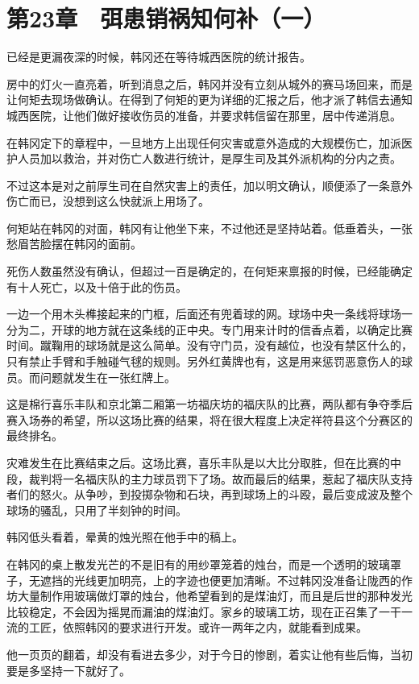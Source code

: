 \section{第23章　弭患销祸知何补（一）}

已经是更漏夜深的时候，韩冈还在等待城西医院的统计报告。

房中的灯火一直亮着，听到消息之后，韩冈并没有立刻从城外的赛马场回来，而是让何矩去现场做确认。在得到了何矩的更为详细的汇报之后，他才派了韩信去通知城西医院，让他们做好接收伤员的准备，并要求韩信留在那里，居中传递消息。

在韩冈定下的章程中，一旦地方上出现任何灾害或意外造成的大规模伤亡，加派医护人员加以救治，并对伤亡人数进行统计，是厚生司及其外派机构的分内之责。

不过这本是对之前厚生司在自然灾害上的责任，加以明文确认，顺便添了一条意外伤亡而已，没想到这么快就派上用场了。

何矩站在韩冈的对面，韩冈有让他坐下来，不过他还是坚持站着。低垂着头，一张愁眉苦脸摆在韩冈的面前。

死伤人数虽然没有确认，但超过一百是确定的，在何矩来禀报的时候，已经能确定有十人死亡，以及十倍于此的伤员。

一边一个用木头榫接起来的门框，后面还有兜着球的网。球场中央一条线将球场一分为二，开球的地方就在这条线的正中央。专门用来计时的信香点着，以确定比赛时间。蹴鞠用的球场就是这么简单。没有守门员，没有越位，也没有禁区什么的，只有禁止手臂和手触碰气毬的规则。另外红黄牌也有，这是用来惩罚恶意伤人的球员。而问题就发生在一张红牌上。

这是棉行喜乐丰队和京北第二厢第一坊福庆坊的福庆队的比赛，两队都有争夺季后赛入场券的希望，所以这场比赛的结果，将在很大程度上决定祥符县这个分赛区的最终排名。

灾难发生在比赛结束之后。这场比赛，喜乐丰队是以大比分取胜，但在比赛的中段，裁判将一名福庆队的主力球员罚下了场。故而最后的结果，惹起了福庆队支持者们的怒火。从争吵，到投掷杂物和石块，再到球场上的斗殴，最后变成波及整个球场的骚乱，只用了半刻钟的时间。

韩冈低头看着，晕黄的烛光照在他手中的稿上。

在韩冈的桌上散发光芒的不是旧有的用纱罩笼着的烛台，而是一个透明的玻璃罩子，无遮挡的光线更加明亮，上的字迹也便更加清晰。不过韩冈没准备让陇西的作坊大量制作用玻璃做灯罩的烛台，他希望看到的是煤油灯，而且是后世的那种发光比较稳定，不会因为摇晃而漏油的煤油灯。家乡的玻璃工坊，现在正召集了一干一流的工匠，依照韩冈的要求进行开发。或许一两年之内，就能看到成果。

他一页页的翻着，却没有看进去多少，对于今日的惨剧，着实让他有些后悔，当初要是多坚持一下就好了。

